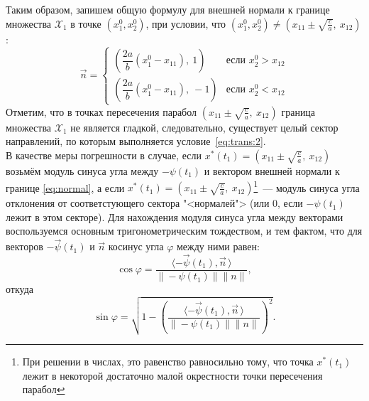 \documentclass[11pt, oneside, final]{article}
\theoremstyle{break}
\numberwithin{equation}{section}
\theoremstyle{plain}
\theoremstyle{definition}
\newcommand{\scalar}[2]{\langle #1, #2\,\rangle}
\begin{document}
    Таким образом, запишем общую формулу для внешней нормали к границе множества \(\mathcal{X}_1\) в точке \(\left(x_1^0, x_2^0\right)\), при условии, что \(\left(x_1^0, x_2^0\right) \neq \left(x_{11} \pm \sqrt{\frac{c}{a}}, \: x_{12} \right)\):
    \begin{equation}
        \label{eq:normal}
        \vec n =
        \begin{cases}
            \left( \dfrac{2a}{b} (x_1^0 - x_{11}), \: 1 \right)& \text{если } x_2^0 > x_{12} \\
            \left( \dfrac{2a}{b} (x_1^0 - x_{11}), \: -1 \right)& \text{если } x_2^0 < x_{12}
        \end{cases}
    \end{equation}
    Отметим, что в точках пересечения парабол \(\left(x_{11} \pm \sqrt{\frac{c}{a}}, \: x_{12} \right)\) граница множества \(\mathcal{X}_1\) не является гладкой, следовательно, существует целый сектор направлений, по которым выполняется условие~\eqref{eq:trans:2}. \\
    В качестве меры погрешности в случае, если \(x^{*}(t_1) = \left(x_{11} \pm \sqrt{\frac{c}{a}}, \: x_{12} \right)\) возьмём модуль синуса угла между \(-\psi(t_1) \) и вектором внешней нормали к границе \eqref{eq:normal}, а если \(x^{*}(t_1) = \left(x_{11} \pm \sqrt{\frac{c}{a}}, \: x_{12} \right)\)\footnote{При решении в числах, это равенство равносильно тому, что точка \(x^{*}(t_1)\) лежит в некоторой достаточно малой окрестности точки пересечения парабол}~--- модуль синуса угла отклонения от соответстующего сектора "<нормалей"> (или 0, если \(-\psi(t_1)\) лежит в этом секторе). Для нахождения модуля синуса угла между векторами воспользуемся основным тригонометрическим тождеством, и тем фактом, что для векторов \(- \vec\psi(t_1) \text{ и } \vec n  \) косинус угла \(\varphi\) между ними равен: 
    \[\cos\varphi = \dfrac{\scalar{- \vec\psi(t_1)}{\vec n}}{\|-\psi(t_1)\| \|n\|}, \]
    откуда 
    \[\sin\varphi = \sqrt{1 - \left(\dfrac{\scalar{- \vec\psi(t_1)}{\vec n}}{\|-\psi(t_1)\| \|n\|}\right)^2}.\]
    \pagebreak
\end{document}

